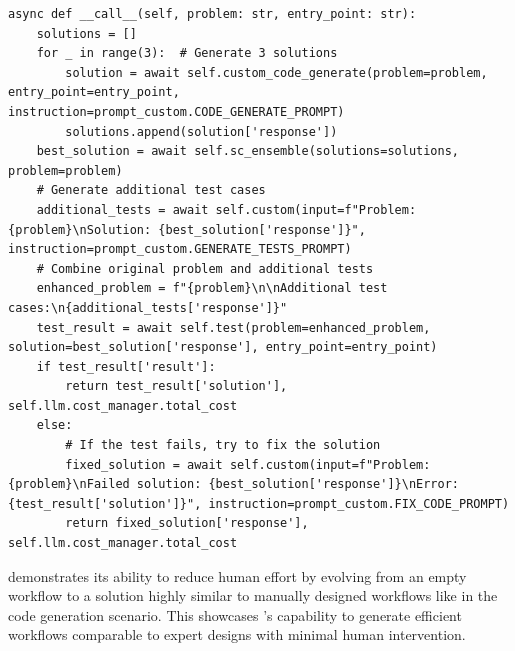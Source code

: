 \begin{tcolorbox}
\begin{verbatim}
async def __call__(self, problem: str, entry_point: str):
    solutions = []
    for _ in range(3):  # Generate 3 solutions
        solution = await self.custom_code_generate(problem=problem, entry_point=entry_point, instruction=prompt_custom.CODE_GENERATE_PROMPT)
        solutions.append(solution['response'])
    best_solution = await self.sc_ensemble(solutions=solutions, problem=problem)
    # Generate additional test cases
    additional_tests = await self.custom(input=f"Problem: {problem}\nSolution: {best_solution['response']}", instruction=prompt_custom.GENERATE_TESTS_PROMPT)
    # Combine original problem and additional tests
    enhanced_problem = f"{problem}\n\nAdditional test cases:\n{additional_tests['response']}"
    test_result = await self.test(problem=enhanced_problem, solution=best_solution['response'], entry_point=entry_point)
    if test_result['result']:
        return test_result['solution'], self.llm.cost_manager.total_cost
    else:
        # If the test fails, try to fix the solution
        fixed_solution = await self.custom(input=f"Problem: {problem}\nFailed solution: {best_solution['response']}\nError: {test_result['solution']}", instruction=prompt_custom.FIX_CODE_PROMPT)
        return fixed_solution['response'], self.llm.cost_manager.total_cost
\end{verbatim}
\end{tcolorbox}
\model demonstrates its ability to reduce human effort by evolving from an empty workflow to a solution highly similar to manually designed workflows like \citet{Tal2024Alpha} in the code generation scenario. This showcases \model's capability to generate efficient workflows comparable to expert designs with minimal human intervention.
